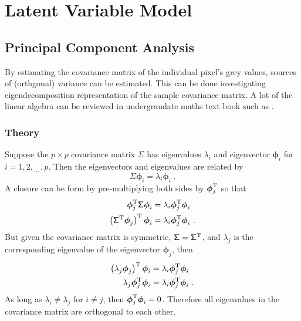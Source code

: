 \documentclass[12pt]{report}
\newcommand{\T}{^\textup{T}}
\newcommand{\dotdotdot}{_{\phantom{.}\cdots}}
\newcommand{\vectGreek}[1]{\boldsymbol{#1}}
\newcommand{\matr}[1]{\mathsf{#1}}
\begin{document}
\chapter{Latent Variable Model}

\section{Principal Component Analysis}
By estimating the covariance matrix of the individual pixel's grey values, sources of (orthgonal) variance can be estimated. This can be done investigating eigendecomposition representation of the sample covariance matrix. A lot of the linear algebra can be reviewed in undergraudate maths text book such as \cite{riley2006mathematical}.

\subsection{Theory}
Suppose the $p\times p$ covariance matrix $\matr{\Sigma}$ has eigenvalues $\lambda_i$ and eigenvector $\vectGreek{\phi}_i$ for $i=1,2,\dotdotdot,p$. Then the eigenvectors and eigenvalues are related by
\begin{equation}
\matr{\Sigma}\vectGreek{\phi}_i = \lambda_i\vectGreek{\phi}_i \ .
\label{eq:eigenvector_eigenvalue_forCovariance}
\end{equation}
A closure can be form by pre-multiplying both sides by $\vectGreek{\phi}_j\T$ so that
\begin{align*}
\vectGreek{\phi}_j\T \matr{\Sigma}\vectGreek{\phi}_i &= \lambda_i\vectGreek{\phi}_j\T\vectGreek{\phi}_i \\
\left(\matr{\Sigma}\T \vectGreek{\phi}_j \right)\T\vectGreek{\phi}_i &= \lambda_i\vectGreek{\phi}_j\T\vectGreek{\phi}_i \ .
\end{align*}
But given the covariance matrix is symmetric, $\matr{\Sigma}=\matr{\Sigma}\T$, and $\lambda_j$ is the corresponding eigenvalue of the eigenvector $\vectGreek{\phi}_j$, then
\begin{align*}
\left(\lambda_j\vectGreek{\phi}_j \right)\T\vectGreek{\phi}_i &= \lambda_i\vectGreek{\phi}_j\T\vectGreek{\phi}_i \\
\lambda_j\vectGreek{\phi}_j\T\vectGreek{\phi}_i &= \lambda_i\vectGreek{\phi}_j\T\vectGreek{\phi}_i \ .
\end{align*}
As long as $\lambda_i\neq\lambda_j$ for $i\neq j$, then $\vectGreek{\phi}_j\T\vectGreek{\phi}_i=0$. Therefore all eigenvalues in the covariance matrix are orthogonal to each other.
\end{document}

